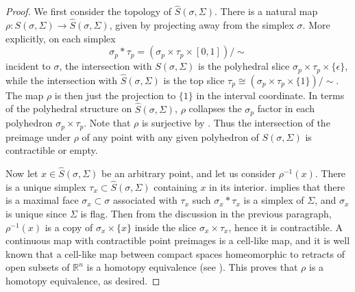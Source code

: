 \documentclass[12pt, letterpaper]{article}
\theoremstyle{plain}
\theoremstyle{definition}
\begin{document}
\begin{proof}
We first consider the topology of $\hat S(\sigma, \Sigma)$. There is a natural map $\rho \colon S(\sigma, \Sigma) \rightarrow \hat S(\sigma, \Sigma)$, given by projecting away from the simplex $\sigma$. More explicitly, on each simplex
    \[ \sigma_p*\tau_p = (\sigma_p \times \tau_p \times [0,1])/\sim \]
incident to $\sigma$, the intersection with $S(\sigma, \Sigma)$ is the polyhedral slice $\sigma_p \times \tau_p \times \{\epsilon\}$, while the intersection with $\hat S(\sigma, \Sigma)$ is the top slice $\tau_p \cong (\sigma_p \times \tau_p \times \{1\})/\sim$. The map $\rho$ is then just the projection to $\{1\}$ in the interval coordinate. In terms of the polyhedral structure on $\hat S(\sigma, \Sigma)$, $\rho$ collapses the $\sigma_p$ factor in each polyhedron $\sigma_p \times \tau_p$. Note that $\rho$ is surjective by . Thus the intersection of the preimage under $\rho$ of any point with any given polyhedron of $S(\sigma, \Sigma)$ is contractible or empty.

    
Now let $x\in \hat S(\sigma, \Sigma)$ be an arbitrary point, and let us consider $\rho^{-1}(x)$. There is a unique simplex $\tau_x \subset \hat S(\sigma, \Sigma)$ containing $x$ in its interior.  implies that there is a maximal face $\sigma_x \subset \sigma$ associated with $\tau_x$ such $\sigma_x * \tau_x$ is a simplex of $\Sigma$, and $\sigma_x$ is unique since $\Sigma$ is flag. Then from the discussion in the previous paragraph, $\rho^{-1}(x)$ is a copy of $\sigma_x \times \{x\}$ inside the slice $\sigma_x \times \tau_x$, hence it is contractible. A continuous map with contractible point preimages is a cell-like map, and it is well known that a cell-like map between compact spaces homeomorphic to retracts of open subsets of $\mathbb{R}^n$ is a homotopy equivalence (see \cite[Cor.\ 1.3]{Lacher}). This proves that $\rho$ is a homotopy equivalence, as desired.


\end{proof}
\end{document}
